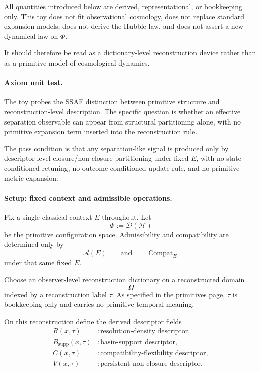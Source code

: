 \documentclass[aps,prx,onecolumn,11pt]{revtex4-2}
\theoremstyle{plain}
\theoremstyle{definition}
\theoremstyle{remark}
\newcommand{\Compat}{\operatorname{Compat}} %
\begin{document}
All quantities introduced below are derived, representational, or
bookkeeping only. This toy does not fit observational cosmology, does
not replace standard expansion models, does not derive the Hubble law,
and does not assert a new dynamical law on \(\Phi\).

It should therefore be read as a dictionary-level reconstruction device
rather than as a primitive model of cosmological dynamics.

\paragraph{Axiom unit test.}

The toy probes the SSAF distinction between primitive structure and
reconstruction-level description. The specific question is whether an
effective separation observable can appear from structural partitioning
alone, with no primitive expansion term inserted into the reconstruction
rule.

The pass condition is that any separation-like signal is produced only
by descriptor-level closure/non-closure partitioning under fixed \(E\),
with no state-conditioned retuning, no outcome-conditioned update rule,
and no primitive metric expansion.

\paragraph{Setup: fixed context and admissible operations.}

Fix a single classical context \(E\) throughout. Let
\[
\Phi:=\mathcal D(\mathcal H)
\]
be the primitive configuration space. Admissibility and compatibility
are determined only by
\[
\mathcal A(E)
\qquad
\text{and}
\qquad
\Compat_E
\]
under that same fixed \(E\).

Choose an observer-level reconstruction dictionary on a reconstructed
domain
\[
\Omega
\]
indexed by a reconstruction label \(\tau\). As specified in the
primitives page, \(\tau\) is bookkeeping only and carries no primitive
temporal meaning.

On this reconstruction define the derived descriptor fields
\begin{align}
R(x,\tau) &: \text{resolution-density descriptor}, \\
B_{\mathrm{supp}}(x,\tau) &: \text{basin-support descriptor}, \\
C(x,\tau) &: \text{compatibility-flexibility descriptor}, \\
V(x,\tau) &: \text{persistent non-closure descriptor}.
\end{align}
\end{document}
